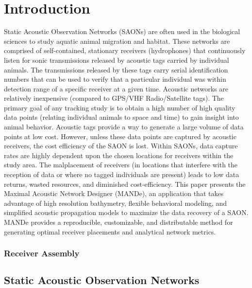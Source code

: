 \chapter{Introduction}
Static Acoustic Observation Networks (SAONs) are often used in the biological sciences to study aquatic animal migration and habitat.  These networks are comprised of self-contained, stationary receivers (hydrophones) that continuously listen for sonic transmissions released by acoustic tags carried by individual animals.  The transmissions released by these tags carry serial identification numbers that can be used to verify that a particular individual was within detection range of a specific receiver at a given time.  Acoustic networks are relatively inexpensive (compared to GPS/VHF Radio/Satellite tags).  The primary goal of any tracking study is to obtain a high number of high quality data points (relating individual animals to space and time) to gain insight into animal behavior.  Acoustic tags provide a way to generate a large volume of data points at low cost.  However, unless these data points are captured by acoustic receivers, the cost efficiency of the SAON is lost.  Within SAONs, data capture rates are highly dependent upon the chosen locations for receivers within the study area.  The malplacement of receivers (in locations that interfere with the reception of data or where no tagged individuals are present) leads to low data returns, wasted resources, and diminished cost-efficiency.  This paper presents the Maximal Acoustic Network Designer (MANDe), an application\cite{acousitcdeploy} that takes advantage of high resolution bathymetry, flexible behavioral modeling, and simplified acoustic propagation models to maximize the data recovery of a SAON.  MANDe provides a reproducible, customizable, and distributable method for generating optimal receiver placements and analytical network metrics.

\subsection{Receiver Assembly}
\section{Static Acoustic Observation Networks}

